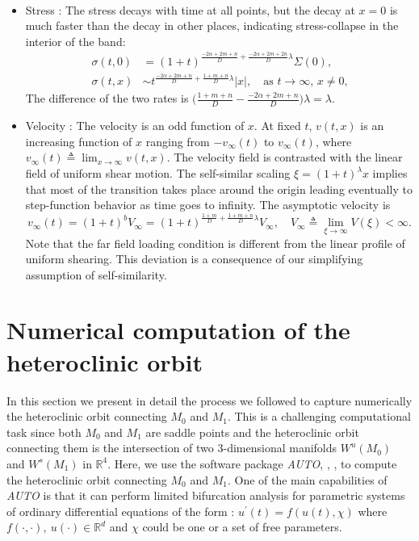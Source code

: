 \documentclass[11pt]{article}
\theoremstyle{remark}
\begin{document}
\begin{itemize}
\begin{align*}
\end{align*}
\item Stress : The stress decays with time at all points, but the decay at  $x=0$ is much faster than the decay in other places,
indicating stress-collapse in the interior of the band:
\begin{align*}
 \sigma(t,0) &= (1+t)^{\frac{-2\alpha+2m+n}{D} + \frac{-2\alpha+2m+2n}{D}\lambda}\Sigma(0),
 \\
 \sigma(t,x) &\sim t^{\frac{-2\alpha+2m+n}{D} +\frac{1+m+n}{D}\lambda}|x|, \quad \text{as $t \rightarrow \infty$, $x\ne0$,}
\end{align*}
The difference of the two rates is $ \big ( \frac{1+m+n}{D} - \frac{-2\alpha+2m+n}{D} \big ) \lambda= \lambda$.


\item Velocity : The velocity is an odd function of $x$. At fixed $t$, $v(t,x)$ is an increasing function of $x$ ranging from $-v_\infty(t)$ to $v_\infty(t)$,
where  $v_\infty(t)\triangleq \lim_{x \rightarrow \infty} v(t,x)$. The velocity field is contrasted with the linear field of uniform shear motion. The self-similar scaling  $\xi=(1+t)^\lambda x$ implies
that most of the transition takes place around the origin leading eventually to step-function behavior as time goes to infinity.
The asymptotic velocity is
$$v_\infty(t)=(1+t)^{b}V_\infty = (1+t)^{\frac{1+m}{D} + \frac{1+m+n}{D}\lambda}V_\infty, \quad V_\infty \triangleq \lim_{\xi \rightarrow \infty} V(\xi) <\infty.$$
Note that the far field loading condition is different from the linear profile of uniform shearing. This deviation is a consequence of our simplifying assumption of self-similarity.
\end{itemize}


\section{Numerical computation of the heteroclinic orbit}
\label{sec:numerics}


In this section we present in detail the process we followed to capture numerically the heteroclinic orbit connecting $M_0$ and $M_1$. This is a
challenging computational task since both $M_0$ and $M_1$ are saddle points and the heteroclinic orbit connecting
them is the intersection of two 3-dimensional manifolds $W^u(M_0)$ and $W^s(M_1)$ in $\mathbb{R} ^4$.
Here, we use the software package \emph{AUTO}, \cite{Doedel_1981}, \cite{DK_1986}, \cite{DCFKSW_1999} to compute the heteroclinic orbit connecting $M_0$ and $M_1$. One of the main capabilities of \emph{AUTO} is that it can perform limited bifurcation analysis for parametric systems of ordinary differential equations of the form : $\displaystyle u^{\prime}(t) = f(u(t),\chi)$
where $f(\cdot,\cdot), \ u(\cdot) \in \mathbb{R}^d$ and $\chi$ could be one or a set of free parameters.
\end{document}
